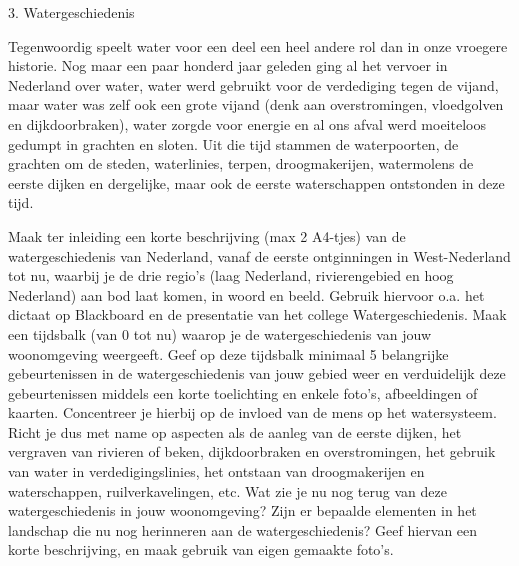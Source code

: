 3. Watergeschiedenis

Tegenwoordig speelt water voor een deel een heel andere rol dan in onze vroegere historie. Nog maar een paar honderd jaar geleden ging al het vervoer in Nederland over water, water werd gebruikt voor de verdediging tegen de vijand, maar water was zelf ook een grote vijand (denk aan overstromingen, vloedgolven en dijkdoorbraken), water zorgde voor energie en al ons afval werd moeiteloos gedumpt in grachten en sloten. Uit die tijd stammen de waterpoorten, de grachten om de steden, waterlinies, terpen, droogmakerijen, watermolens de eerste dijken en dergelijke, maar ook de eerste waterschappen ontstonden in deze tijd.

Maak ter inleiding een korte beschrijving (max 2 A4-tjes) van de watergeschiedenis van Nederland, vanaf de eerste ontginningen in West-Nederland tot nu, waarbij je de drie regio’s (laag Nederland, rivierengebied en hoog Nederland) aan bod laat komen, in woord en beeld. Gebruik hiervoor o.a. het dictaat op Blackboard en de presentatie van het college Watergeschiedenis. 
Maak een tijdsbalk (van 0 tot nu) waarop je de watergeschiedenis van jouw woonomgeving weergeeft. Geef op deze tijdsbalk minimaal 5 belangrijke gebeurtenissen in de watergeschiedenis van jouw gebied weer en verduidelijk deze gebeurtenissen middels een korte toelichting en enkele foto’s, afbeeldingen of kaarten. Concentreer je hierbij op de invloed van de mens op het watersysteem. Richt je dus met name op aspecten als de aanleg van de eerste dijken, het vergraven van rivieren of beken, dijkdoorbraken en overstromingen, het gebruik van water in verdedigingslinies, het ontstaan van droogmakerijen en waterschappen, ruilverkavelingen, etc.
Wat zie je nu nog terug van deze watergeschiedenis in jouw woonomgeving? Zijn er bepaalde elementen in het landschap die nu nog herinneren aan de watergeschiedenis? Geef hiervan een korte beschrijving, en maak gebruik van eigen gemaakte foto’s.